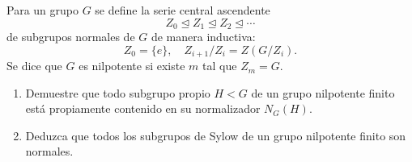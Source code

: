 \begin{ejer}
Para un grupo $G$ se define la
serie central ascendente
\[
Z_0 \trianglelefteq Z_1 \trianglelefteq Z_2 \trianglelefteq \cdots
\]
de subgrupos normales de $G$ de manera inductiva:
\[
Z_0 = \{e\}, \quad Z_{i+1}/Z_i = Z(G/Z_i).
\]
Se dice que $G$ es nilpotente si existe $m$ tal que $Z_m = G$.
\begin{enumerate}[label = (\alph*)]
\item Demuestre que todo subgrupo propio $H < G$ de un grupo nilpotente finito está propiamente contenido en su normalizador $N_G(H)$.

\item Deduzca que todos los subgrupos de Sylow de un grupo nilpotente finito son normales.
\end{enumerate}
\end{ejer}
